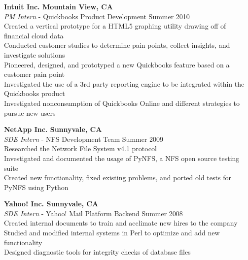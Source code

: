 \documentclass[margin,line]{resume}
\begin{document}
\begin{resume}
    \textbf{\listing Intuit Inc. \hfill Mountain View, CA}\\
    \textsl{PM Intern} - Quickbooks Product Development \hfill Summer 2010\\
      \hspace*{\identsize} Created a vertical prototype for a HTML5 graphing utility drawing off of financial cloud data\\
      \hspace*{\identsize} Conducted customer studies to determine pain points, collect insights, and investigate solutions\\
      \hspace*{\identsize} Pioneered, designed, and prototyped a new Quickbooks feature based on a customer pain point\\
      \hspace*{\identsize} Investigated the use of a 3rd party reporting engine to be integrated within the Quickbooks product\\
      \hspace*{\identsize} Investigated nonconsumption of Quickbooks Online and different strategies to pursue new users
    \vspace{-2mm}

    \textbf{\listing NetApp Inc. \hfill Sunnyvale, CA}\\
    \textsl{SDE Intern} - NFS Development Team \hfill Summer 2009\\
      \hspace*{\identsize} Researched the Network File System v4.1 protocol\\
      \hspace*{\identsize} Investigated and documented the usage of PyNFS, a NFS open source testing suite\\
      \hspace*{\identsize} Created new functionality, fixed existing problems, and ported old tests for PyNFS using Python
    \vspace{-2mm}

    \textbf{\listing Yahoo! Inc. \hfill Sunnyvale, CA}\\
    \textsl{SDE Intern} - Yahoo! Mail Platform Backend \hfill Summer 2008\\
      \hspace*{\identsize} Created internal documents to train and acclimate new hires to the company\\
      \hspace*{\identsize} Studied and modified internal systems in Perl to optimize and add new functionality\\
      \hspace*{\identsize} Designed diagnostic tools for integrity checks of database files


\end{resume}
\end{document}
